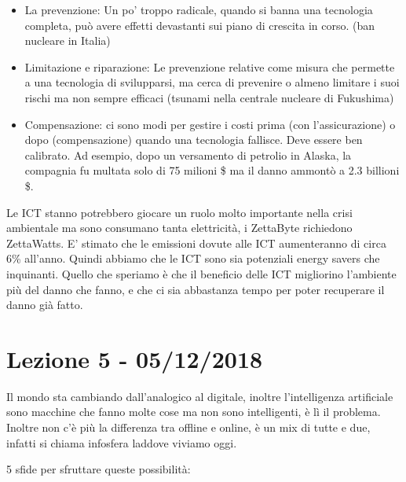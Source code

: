 \documentclass[a4page, 11pt]{article}
\begin{document}
\begin{itemize}
	 
	\item
	La prevenzione: Un po' troppo radicale, quando si banna una tecnologia
	completa, può avere effetti devastanti sui piano di crescita in corso.
	(ban nucleare in Italia)
	\item
	Limitazione e riparazione: Le prevenzione relative come misura che
	permette a una tecnologia di svilupparsi, ma cerca di prevenire o
	almeno limitare i suoi rischi ma non sempre efficaci (tsunami nella
	centrale nucleare di Fukushima)
	\item
	Compensazione: ci sono modi per gestire i costi prima (con
	l'assicurazione) o dopo (compensazione) quando una tecnologia
	fallisce. Deve essere ben calibrato. Ad esempio, dopo un versamento di
	petrolio in Alaska, la compagnia fu multata solo di 75 milioni \$ ma
	il danno ammontò a 2.3 billioni \$.
\end{itemize}

Le ICT stanno potrebbero giocare un ruolo molto importante nella crisi
ambientale ma sono consumano tanta elettricità, i ZettaByte richiedono
ZettaWatts. E' stimato che le emissioni dovute alle ICT aumenteranno di
circa 6\% all'anno. Quindi abbiamo che le ICT sono sia potenziali energy
savers che inquinanti. Quello che speriamo è che il beneficio delle ICT
migliorino l'ambiente più del danno che fanno, e che ci sia abbastanza
tempo per poter recuperare il danno già fatto.
\section*{Lezione 5 - 05/12/2018}

Il mondo sta cambiando dall'analogico al digitale, inoltre
l'intelligenza artificiale sono macchine che fanno molte cose ma non
sono intelligenti, è lì il problema. Inoltre non c'è più la differenza
tra offline e online, è un mix di tutte e due, infatti si chiama
infosfera laddove viviamo oggi.

5 sfide per sfruttare queste possibilità:
\end{document}
